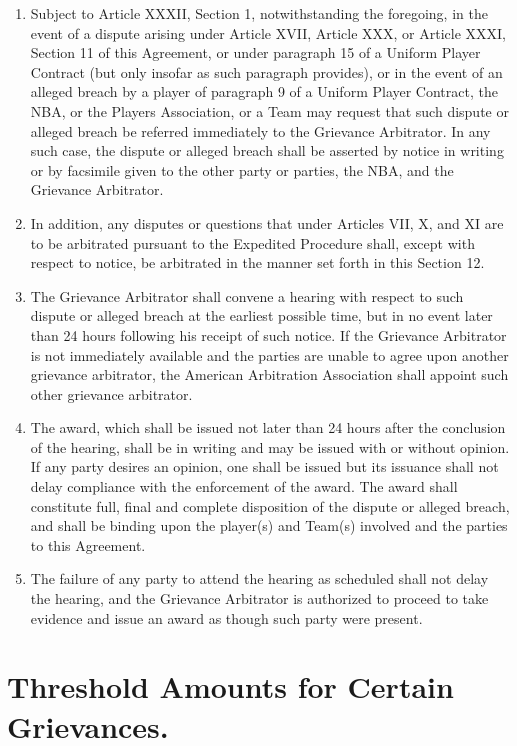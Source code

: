 \documentclass[
]{book}
\providecommand{\tightlist}{%
  \setlength{\itemsep}{0pt}\setlength{\parskip}{0pt}}
\begin{document}
\begin{enumerate}
\def\labelenumi{(\alph{enumi})}
\tightlist
\item
  Subject to Article XXXII, Section 1, notwithstanding the foregoing, in the event of a dispute arising under Article XVII, Article XXX, or Article XXXI, Section 11 of this Agreement, or under paragraph 15 of a Uniform Player Contract (but only insofar as such paragraph provides), or in the event of an alleged breach by a player of paragraph 9 of a Uniform Player Contract, the NBA, or the Players Association, or a Team may request that such dispute or alleged breach be referred immediately to the Grievance Arbitrator. In any such case, the dispute or alleged breach shall be asserted by notice in writing or by facsimile given to the other party or parties, the NBA, and the Grievance Arbitrator.
\item
  In addition, any disputes or questions that under Articles VII, X, and XI are to be arbitrated pursuant to the Expedited Procedure shall, except with respect to notice, be arbitrated in the manner set forth in this Section 12.
\item
  The Grievance Arbitrator shall convene a hearing with respect to such dispute or alleged breach at the earliest possible time, but in no event later than 24 hours following his receipt of such notice. If the Grievance Arbitrator is not immediately available and the parties are unable to agree upon another grievance arbitrator, the American Arbitration Association shall appoint such other grievance arbitrator.
\item
  The award, which shall be issued not later than 24 hours after the conclusion of the hearing, shall be in writing and may be issued with or without opinion. If any party desires an opinion, one shall be issued but its issuance shall not delay compliance with the enforcement of the award. The award shall constitute full, final and complete disposition of the dispute or alleged breach, and shall be binding upon the player(s) and Team(s) involved and the parties to this Agreement.
\item
  The failure of any party to attend the hearing as scheduled shall not delay the hearing, and the Grievance Arbitrator is authorized to proceed to take evidence and issue an award as though such party were present.
\end{enumerate}

\hypertarget{threshold-amounts-for-certain-grievances.}{%
\section{Threshold Amounts for Certain Grievances.}\label{threshold-amounts-for-certain-grievances.}}
\end{document}
